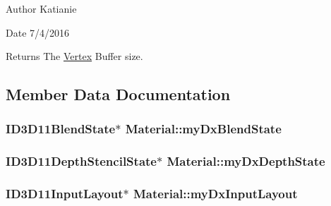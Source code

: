 \begin{DoxyAuthor}{Author}
Katianie 
\end{DoxyAuthor}
\begin{DoxyDate}{Date}
7/4/2016
\end{DoxyDate}
\begin{DoxyReturn}{Returns}
The \hyperlink{class_vertex}{Vertex} Buffer size. 
\end{DoxyReturn}


\subsection{Member Data Documentation}
\subsubsection[{\texorpdfstring{my\+Dx\+Blend\+State}{myDxBlendState}}]{\setlength{\rightskip}{0pt plus 5cm}I\+D3\+D11\+Blend\+State$\ast$ Material\+::my\+Dx\+Blend\+State\hspace{0.3cm}{\ttfamily [protected]}}\hypertarget{class_material_a7ca4cd5b86b5bb28a2223beb16927acb}{}\label{class_material_a7ca4cd5b86b5bb28a2223beb16927acb}
\subsubsection[{\texorpdfstring{my\+Dx\+Depth\+State}{myDxDepthState}}]{\setlength{\rightskip}{0pt plus 5cm}I\+D3\+D11\+Depth\+Stencil\+State$\ast$ Material\+::my\+Dx\+Depth\+State\hspace{0.3cm}{\ttfamily [protected]}}\hypertarget{class_material_a2992d32b4525b2f9e4b0005919ddf76e}{}\label{class_material_a2992d32b4525b2f9e4b0005919ddf76e}
\subsubsection[{\texorpdfstring{my\+Dx\+Input\+Layout}{myDxInputLayout}}]{\setlength{\rightskip}{0pt plus 5cm}I\+D3\+D11\+Input\+Layout$\ast$ Material\+::my\+Dx\+Input\+Layout\hspace{0.3cm}{\ttfamily [protected]}}\hypertarget{class_material_a72b8f75d4f289a8225c8f924964e4770}{}\label{class_material_a72b8f75d4f289a8225c8f924964e4770}
